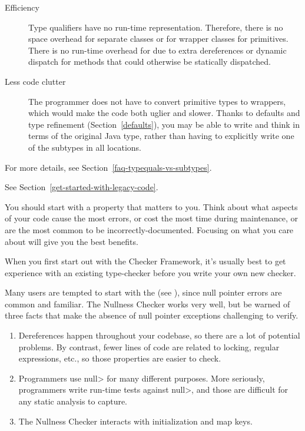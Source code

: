 \begin{description}
\item[Efficiency]
  Type qualifiers have no run-time representation.  Therefore, there is no
  space overhead for separate classes or for wrapper classes for
  primitives.  There is no run-time overhead for due to extra dereferences
  or dynamic dispatch for methods that could otherwise be statically
  dispatched.

\item[Less code clutter]
  The programmer does not have to convert primitive types to wrappers,
  which would make the code both uglier and slower.  Thanks to defaults and
  type refinement (Section~\ref{defaults}),
  you may be able to write and think in terms of the
  original Java type, rather than having to explicitly write one of the
  subtypes in all locations.

\end{description}


For more details, see Section~\ref{faq-typequals-vs-subtypes}.





See Section~\ref{get-started-with-legacy-code}.



You should start with a property that matters to you.  Think about what
aspects of your code cause the most errors, or cost the most time during
maintenance, or are the most common to be incorrectly-documented.  Focusing
on what you care about will give you the best benefits.

When you first start out with the Checker Framework, it's usually best to
get experience with an existing type-checker before you write your own new
checker.

Many users are tempted to start with the
 (see
), since null pointer errors are common
and familiar.  The Nullness Checker works very well, but be warned of three
facts that make the absence of null pointer exceptions challenging to
verify.

\begin{enumerate}
\item
  Dereferences happen throughout your codebase, so there are a lot of
  potential problems.  By contrast, fewer lines of code are related to
  locking, regular expressions, etc., so those properties are easier to
  check.
\item
  Programmers use \<null> for many different purposes.  More seriously,
  programmers write run-time tests against \<null>, and those are difficult
  for any static analysis to capture.
\item
  The Nullness Checker interacts with initialization and map keys.
\end{enumerate}

